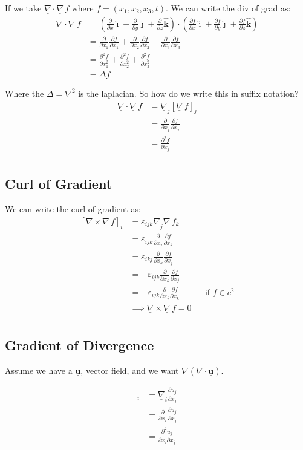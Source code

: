 \documentclass{article}
\renewcommand{\vec}[1]{\underline{\textbf{#1}}}
\newcommand{\veci}{\bm{\hat{\imath}}}
\newcommand{\vecj}{\bm{\hat{\jmath}}}
\newcommand{\veck}{\bm{\hat{k}}}
\newcommand{\e}{\varepsilon}
\newcommand{\nab}{\underline{\nabla}}
\newcommand{\grad}{{\nab}\, f}
\newcommand{\pd}[2]{\frac{\partial #1}{\partial #2}}
\renewcommand{\div}{\nab \cdot}
\newcommand{\curl}{\nab \times}
\begin{document}
If we take $\nab \cdot \grad$ where $f = (x_1, x_2, x_3, t)$. We can write the div of grad as:
\begin{align*}
  \div \grad &= \left(\pd{}{x}\veci + \pd{}{y}\vecj + \pd{}{z}\veck \right) \cdot \left(\pd{f}{x}\veci + \pd{f}{y}\vecj + \pd{f}{z}\veck \right) \\
  &= \pd{}{x_1}\pd{f}{x_1} + \pd{}{x_2}\pd{f}{x_2} + \pd{}{x_3}\pd{f}{x_3}\\
  &= \pd{^2 f}{x_1^2} + \pd{^2 f}{x_2^2} + \pd{^2 f}{x_3^2}\\
  &= \Delta f
\end{align*}

Where the $\Delta = \nab ^2$ is the laplacian. So how do we write this in suffix notation?
\begin{align*}
  \div \grad &= \nab_j[\grad]_j\\
  &= \pd{}{x_j} \pd{f}{x_j}\\
  &= \pd{^2 f}{x_j}\\
\end{align*}

\subsection{Curl of Gradient}

We can write the curl of gradient as:
\begin{align*}
  \left[\curl \grad\right]_i &= \e_{ijk}\nab_j\grad_k\\
  &= \e_{ijk}\pd{}{x_j}\pd{f}{x_k}\\
  &= \e_{ikj}\pd{}{x_k}\pd{f}{x_j}\\
  &= - \e_{ijk}\pd{}{x_k}\pd{f}{x_j}\\
  &= - \e_{ijk}\pd{}{x_j}\pd{f}{x_k} && \text{if $f\in c^2$}\\
  &\implies \curl\grad = 0\\
\end{align*}

\subsection{Gradient of Divergence}
Assume we have a $\vec u$, vector field, and we want $\nab (\div\vec u)$.

\begin{align*}
  [\nab(\div\vec u)]_i &= \nab_i \pd{u_j}{x_j} \\
  &= \pd{}{x_i}\pd{u_j}{x_j} \\
  &= \pd{^2 u_j}{x_i\partial x_j}
\end{align*}
\end{document}
